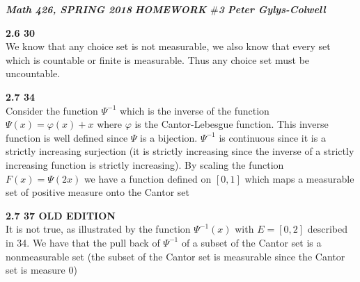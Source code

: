 \documentclass[12pt]{article}
\newenvironment{ques}[1]{\textbf{#1}\vspace{1 mm}\\ }{\bigskip}
\theoremstyle{definition}
\renewcommand{\-}{\backslash}
\begin{document}
\noindent \textit{\textbf{Math 426, SPRING 2018}} \hspace{1.3cm}
\textit{\textbf{HOMEWORK $\#$3}} \hspace{1.3cm} \textit{\textbf{Peter
Gylys-Colwell}} 

\vspace{1cm}
\begin{ques}{2.6 30}
	We know that any choice set is not measurable, we also know that every set
	which is countable or finite is measurable. Thus any choice set must be uncountable.
\end{ques}

\begin{ques}{2.7 34}
	Consider the function $\Psi^{-1}$ which is the inverse of the function
	$\Psi(x) = \varphi(x) + x$ where $\varphi$ is the Cantor-Lebesgue function.
	This inverse function is well defined since $\Psi$ is a bijection.
	$\Psi^{-1}$ is continuous since it is a strictly increasing surjection (it
	is strictly increasing since the inverse of a strictly increasing function
	is strictly increasing). By scaling the function $F(x) = \Psi(2x)$ we have
	a function defined on $[0,1]$ which maps a measurable set of positive
	measure onto the Cantor set
\end{ques}

\begin{ques}{2.7 37 OLD EDITION}
	It is not true, as illustrated by the function $\Psi^{-1}(x)$ with $E =
	[0,2]$ described in 34. We have that the pull back of $\Psi^{-1}$
	of a subset of the Cantor set is a nonmeasurable set (the subset of the
	Cantor set is measurable since the Cantor set is measure $0$)
\end{ques}
\end{document}
